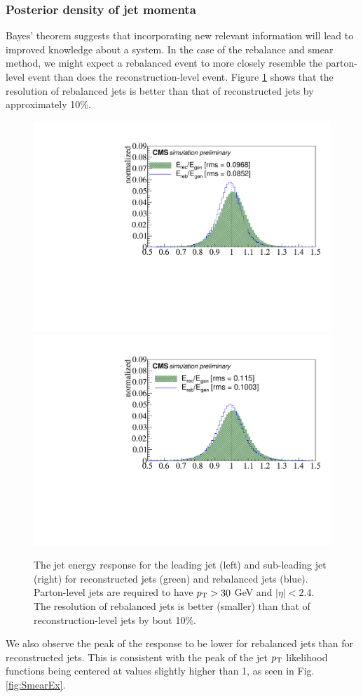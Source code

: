 \subsubsection{Posterior density of jet momenta}
Bayes' theorem suggests that incorporating new relevant information will lead to improved knowledge about a system. In the case of the rebalance and smear method, we might expect a rebalanced event to more closely resemble the parton-level event than does the reconstruction-level event. Figure \ref{fig:rebareso} shows that the resolution of rebalanced jets is better than that of reconstructed jets by approximately 10\%.
\begin{figure}[h]
\centering
\includegraphics[width=0.49\linewidth]{figures/SusySearches/Ra2b2016/Jet1Resolution.pdf}
\includegraphics[width=0.49\linewidth]{figures/SusySearches/Ra2b2016/Jet2Resolution.pdf}
\caption{The jet energy response for the leading jet (left) and sub-leading jet (right) for reconstructed jets (green) and rebalanced jets (blue). Parton-level jets are required to have $p_{\text{T}}>30$ GeV and $|\eta|<2.4$. The resolution of rebalanced jets is better (smaller) than that of reconstruction-level jets by bout 10\%.}
\label{fig:rebareso}
\end{figure}
We also observe the peak of the response to be lower for rebalanced jets than for reconstructed jets. This is consistent with the peak of the jet $p_{\text{T}}$ likelihood functions being centered at values slightly higher than 1, as seen in Fig. \ref{fig:SmearEx}. 
\FloatBarrier

